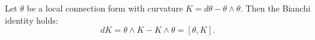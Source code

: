 Let $\theta$ be a local connection form with curvature $K = d\theta - \theta \wedge \theta$. Then the Bianchi identity holds:
$$
dK = \theta \wedge K - K \wedge \theta = [\theta, K].
$$
